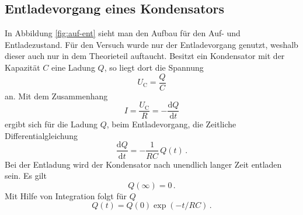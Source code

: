 \subsection{Entladevorgang eines Kondensators}
In Abbildung \ref{fig:auf-ent} sieht man den Aufbau für den Auf- und Entladezustand.
Für den Versuch wurde nur der Entladevorgang genutzt, weshalb dieser auch nur in dem Theorieteil auftaucht.
Besitzt ein Kondensator mit der Kapazität $C$ eine Ladung $Q$, so liegt dort die Spannung 
\begin{equation*}
    U_\text{C}=\frac{Q}{C}
\end{equation*}
an. Mit dem Zusammenhang
\begin{equation*}
    I=\frac{U_\text{C}}{R}=- \frac{\text{d}Q}{\text{d}t}
\end{equation*}
ergibt sich für die Ladung $Q$, beim Entladevorgang, die Zeitliche Differentialgleichung
\begin{equation}
    \label{eqn:Q-DGL}
    \frac{\text{d}Q}{\text{d}t}=-\frac{1}{RC}\,Q(t)\, .
\end{equation}
Bei der Entladung wird der Kondensator nach unendlich langer Zeit entladen sein. Es gilt
\begin{equation*}
    Q(\infty)=0\, .
\end{equation*}
Mit Hilfe von Integration folgt für $Q$
\begin{equation}
    Q(t)=Q(0)\exp(-t/RC)\, .
\end{equation}
